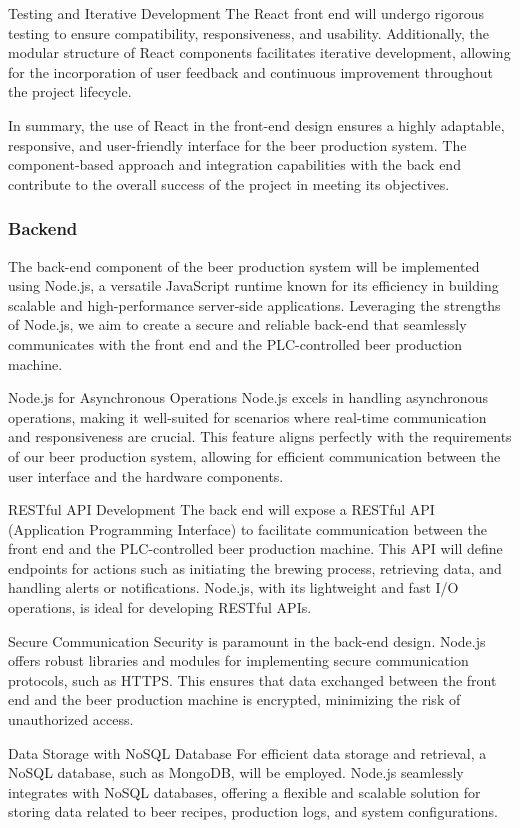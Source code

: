 Testing and Iterative Development
The React front end will undergo rigorous testing to ensure compatibility, responsiveness, and usability. Additionally, the modular structure of React components facilitates iterative development, allowing for the incorporation of user feedback and continuous improvement throughout the project lifecycle.

In summary, the use of React in the front-end design ensures a highly adaptable, responsive, and user-friendly interface for the beer production system. The component-based approach and integration capabilities with the back end contribute to the overall success of the project in meeting its objectives.

\subsubsection{Backend}
The back-end component of the beer production system will be implemented using Node.js, a versatile JavaScript runtime known for its efficiency in building scalable and high-performance server-side applications. Leveraging the strengths of Node.js, we aim to create a secure and reliable back-end that seamlessly communicates with the front end and the PLC-controlled beer production machine.

Node.js for Asynchronous Operations
Node.js excels in handling asynchronous operations, making it well-suited for scenarios where real-time communication and responsiveness are crucial. This feature aligns perfectly with the requirements of our beer production system, allowing for efficient communication between the user interface and the hardware components.

RESTful API Development
The back end will expose a RESTful API (Application Programming Interface) to facilitate communication between the front end and the PLC-controlled beer production machine. This API will define endpoints for actions such as initiating the brewing process, retrieving data, and handling alerts or notifications. Node.js, with its lightweight and fast I/O operations, is ideal for developing RESTful APIs.

Secure Communication
Security is paramount in the back-end design. Node.js offers robust libraries and modules for implementing secure communication protocols, such as HTTPS. This ensures that data exchanged between the front end and the beer production machine is encrypted, minimizing the risk of unauthorized access.

Data Storage with NoSQL Database
For efficient data storage and retrieval, a NoSQL database, such as MongoDB, will be employed. Node.js seamlessly integrates with NoSQL databases, offering a flexible and scalable solution for storing data related to beer recipes, production logs, and system configurations.

